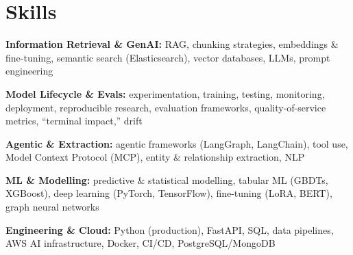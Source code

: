 \documentclass[10pt,a4paper]{article}
\begin{document}
\section{Skills}
\begin{tight}
  \item[\textcolor{accent}{\small$\bullet$}] \textbf{Information Retrieval \& GenAI:} RAG, chunking strategies, embeddings \& fine-tuning, semantic search (Elasticsearch), vector databases, LLMs, prompt engineering
  \item[\textcolor{accent}{\small$\bullet$}] \textbf{Model Lifecycle \& Evals:} experimentation, training, testing, monitoring, deployment, reproducible research, evaluation frameworks, quality-of-service metrics, ``terminal impact,'' drift
  \item[\textcolor{accent}{\small$\bullet$}] \textbf{Agentic \& Extraction:} agentic frameworks (LangGraph, LangChain), tool use, Model Context Protocol (MCP), entity \& relationship extraction, NLP
  \item[\textcolor{accent}{\small$\bullet$}] \textbf{ML \& Modelling:} predictive \& statistical modelling, tabular ML (GBDTs, XGBoost), deep learning (PyTorch, TensorFlow), fine-tuning (LoRA, BERT), graph neural networks
  \item[\textcolor{accent}{\small$\bullet$}] \textbf{Engineering \& Cloud:} Python (production), FastAPI, SQL, data pipelines, AWS AI infrastructure, Docker, CI/CD, PostgreSQL/MongoDB
\end{tight}

\end{document}
